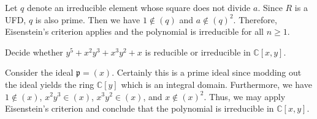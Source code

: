 \documentclass[../../master.tex]{subfiles}
\begin{document}
\begin{solution}
    Let $q$ denote an irreducible element whose square does not divide $a$.
    Since $R$ is a UFD, $q$ is also prime.
    Then we have $1 \notin (q)$ and $a \notin (q)^2$.
    Therefore, Eisenstein's criterion applies and the polynomial is irreducible for all $n \geq 1$.
\end{solution}

\begin{problem}
    Decide whether $y^{5} + x^2 y^3 + x^3 y^2 + x$ is reducible or irreducible in $\mathbb{C}[x, y]$.
\end{problem}

\begin{solution}
    Consider the ideal $\mathfrak{p} = (x)$. 
    Certainly this is a prime ideal since modding out the ideal yields the ring $\mathbb{C}[y]$ which is an integral domain.
    Furthermore, we have $1 \notin (x)$, $x^2 y^3 \in (x)$, $x^3 y^2 \in (x)$, and $x \notin (x)^2$.
    Thus, we may apply Eisenstein's criterion and conclude that the polynomial is irreducible in $\mathbb{C}[x, y]$.
\end{solution}
\end{document}
